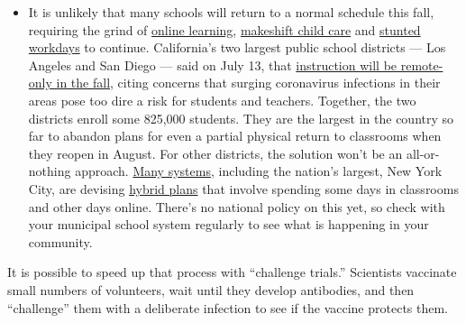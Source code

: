 \begin{itemize}
  \begin{itemize}
  \tightlist
  \item
    It is unlikely that many schools will return to a normal schedule
    this fall, requiring the grind of
    \href{https://www.nytimes.com/2020/06/05/us/coronavirus-education-lost-learning.html?action=click\&pgtype=Article\&state=default\&region=MAIN_CONTENT_3\&context=storylines_faq}{online
    learning},
    \href{https://www.nytimes.com/2020/05/29/us/coronavirus-child-care-centers.html?action=click\&pgtype=Article\&state=default\&region=MAIN_CONTENT_3\&context=storylines_faq}{makeshift
    child care} and
    \href{https://www.nytimes.com/2020/06/03/business/economy/coronavirus-working-women.html?action=click\&pgtype=Article\&state=default\&region=MAIN_CONTENT_3\&context=storylines_faq}{stunted
    workdays} to continue. California's two largest public school
    districts --- Los Angeles and San Diego --- said on July 13, that
    \href{https://www.nytimes.com/2020/07/13/us/lausd-san-diego-school-reopening.html?action=click\&pgtype=Article\&state=default\&region=MAIN_CONTENT_3\&context=storylines_faq}{instruction
    will be remote-only in the fall}, citing concerns that surging
    coronavirus infections in their areas pose too dire a risk for
    students and teachers. Together, the two districts enroll some
    825,000 students. They are the largest in the country so far to
    abandon plans for even a partial physical return to classrooms when
    they reopen in August. For other districts, the solution won't be an
    all-or-nothing approach.
    \href{https://bioethics.jhu.edu/research-and-outreach/projects/eschool-initiative/school-policy-tracker/}{Many
    systems}, including the nation's largest, New York City, are
    devising
    \href{https://www.nytimes.com/2020/06/26/us/coronavirus-schools-reopen-fall.html?action=click\&pgtype=Article\&state=default\&region=MAIN_CONTENT_3\&context=storylines_faq}{hybrid
    plans} that involve spending some days in classrooms and other days
    online. There's no national policy on this yet, so check with your
    municipal school system regularly to see what is happening in your
    community.
  \end{itemize}
\end{itemize}

It is possible to speed up that process with ``challenge trials.''
Scientists vaccinate small numbers of volunteers, wait until they
develop antibodies, and then ``challenge'' them with a deliberate
infection to see if the vaccine protects them.

